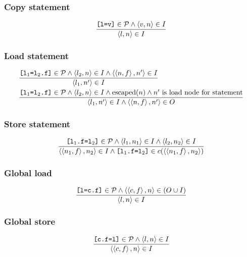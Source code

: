 \documentclass[11pt,notitlepage]{article}
\begin{document}
\subsubsection{Copy statement}

\begin{displaymath}
\dfrac
{\text{\tt [l=v]}\in\mathcal{P} \wedge \left\langle v,n \right\rangle\in I}
{\left\langle l,n \right\rangle\in I}
\end{displaymath}

\subsubsection{Load statement}

\begin{eqnarray*}
&
\dfrac
{\text{\tt [l$_1$=l$_2$.f]}\in\mathcal{P} \wedge
 \left\langle l_2,n \right\rangle\in I \wedge
 \left\langle \left\langle n,f \right\rangle,n' \right\rangle\in I}
{\left\langle l_1,n' \right\rangle\in I}
\\&
\dfrac
{\text{\tt [l$_1$=l$_2$.f]}\in\mathcal{P} \wedge
 \left\langle l_2,n \right\rangle\in I \wedge
 \text{escaped}(n) \wedge
 n' \text{ is load node for statement} }
{\left\langle l_1,n' \right\rangle\in I \wedge \left\langle \left\langle n,f \right\rangle,n' \right\rangle\in O}
\end{eqnarray*}

\subsubsection{Store statement}

\begin{displaymath}
\dfrac
{\text{\tt [l$_1$.f=l$_2$]}\in\mathcal{P} \wedge
 \left\langle l_1,n_1 \right\rangle\in I \wedge
 \left\langle l_2,n_2 \right\rangle\in I }
{\left\langle \left\langle n_1,f \right\rangle,n_2 \right\rangle\in I \wedge
 \text{\tt [l$_1$.f=l$_2$]}\in c(\left\langle \left\langle n_1,f \right\rangle,n_2 \right\rangle) }
\end{displaymath}

\subsubsection{Global load}

\begin{displaymath}
\dfrac
{\text{\tt [l=c.f]}\in\mathcal{P} \wedge
 \left\langle \left\langle c,f \right\rangle,n \right\rangle\in (O\cup I) }
{\left\langle l,n \right\rangle\in I}
\end{displaymath}

\subsubsection{Global store}

\begin{displaymath}
\dfrac
{\text{\tt [c.f=l]}\in\mathcal{P} \wedge
 \left\langle l,n \right\rangle\in I}
{\left\langle \left\langle c,f \right\rangle,n \right\rangle\in I}
\end{displaymath}
\end{document}
